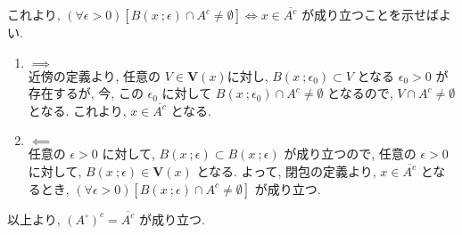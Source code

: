 \documentclass[dvipdfmx,a4j]{jarticle}
\begin{document}
{これより, $(\forall \epsilon > 0)[B(x\ ;\epsilon) \cap A^c \neq \emptyset] \iff x \in \overline{A^c}$ が成り立つことを示せばよい.
\begin{enumerate}
    \item $\implies$\\
    近傍の定義より, 任意の $V \in \bm{V}(x)$に対し, $B(x\ ;\epsilon_0) \subset V$ となる $\epsilon_0 > 0$ が存在するが, 今, この $\epsilon_0$ に対して $B(x\ ;\epsilon_0) \cap A^c \neq \emptyset$
    となるので, $V \cap A^c \neq \emptyset$ となる. これより, $x \in \overline{A^c}$ となる.
    \item $\impliedby$\\ 
    任意の $\epsilon > 0$ に対して, $B(x\ ;\epsilon) \subset B(x\ ;\epsilon)$ が成り立つので, 任意の $\epsilon > 0$ に対して, $B(x\ ;\epsilon) \in \bm{V}(x)$ となる.
    よって, 閉包の定義より, $x \in \overline{A^c}$ となるとき, $(\forall \epsilon > 0)[B(x\ ;\epsilon) \cap A^c \neq \emptyset]$ が成り立つ.
\end{enumerate}
以上より, $(A^\circ)^c = \overline{A^c}$ が成り立つ.
}
\end{document}
